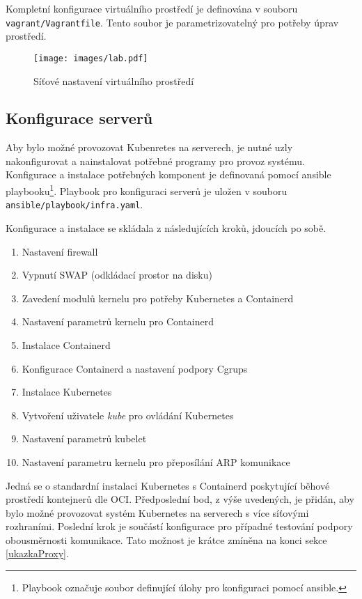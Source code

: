 Kompletní konfigurace virtuálního prostředí je definována v souboru \verb|vagrant/Vagrantfile|. Tento soubor je parametrizovatelný pro potřeby úprav prostředí. 
\begin{figure}[ht]
    \centering
    \texttt{[image: images/lab.pdf]}
    \caption{Síťové nastavení virtuálního prostředí}
    \label{fig:lab}
\end{figure}

\subsection{Konfigurace serverů}
Aby bylo možné provozovat Kubenretes na serverech, je nutné uzly nakonfigurovat a nainstalovat potřebné programy pro provoz systému. Konfigurace a instalace potřebných komponent je definovaná pomocí ansible playbooku\footnote{Playbook označuje soubor definující úlohy pro konfiguraci pomocí ansible.}. Playbook pro konfiguraci serverů je uložen v souboru \verb|ansible/playbook/infra.yaml|.

Konfigurace a instalace se skládala z následujících kroků, jdoucích po sobě.
\begin{enumerate}
    \item Nastavení firewall
    \item Vypnutí SWAP (odkládací prostor na disku)
    \item Zavedení modulů kernelu pro potřeby Kubernetes a Containerd
    \item Nastavení parametrů kernelu pro Containerd
    \item Instalace Containerd
    \item Konfigurace Containerd a nastavení podpory Cgrups
    \item Instalace Kubernetes
    \item Vytvoření uživatele \textit{kube} pro ovládání Kubernetes
    \item Nastavení parametrů kubelet\label{en:ip_set}
    \item Nastavení parametru kernelu pro přeposílání ARP komunikace\label{en:arp_forward}
\end{enumerate}
Jedná se o standardní instalaci Kubernetes s Containerd poskytující běhové prostředí kontejnerů dle OCI. Předposlední bod, z výše uvedených, je přidán, aby bylo možné provozovat systém Kubernetes na serverech s více síťovými rozhraními. Poslední krok je součástí konfigurace pro případné testování podpory obousměrnosti komunikace. Tato možnost je krátce zmíněna na konci sekce \ref{ukazkaProxy}.

